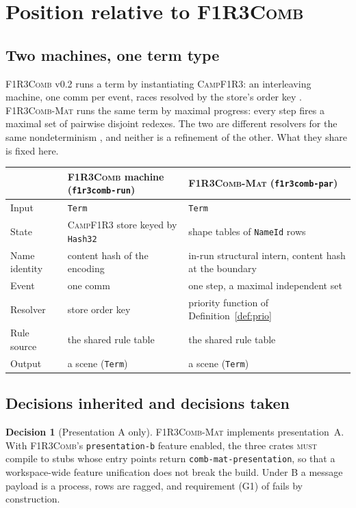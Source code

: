 \documentclass[11pt,a4paper]{article}
\newcommand{\code}[1]{\texttt{#1}}
\newcommand{\Comb}{\textsc{F1R3Comb}}
\newcommand{\Mat}{\textsc{F1R3Comb-Mat}}
\newcommand{\Camp}{\textsc{CampF1R3}}
\newcommand{\MUST}{\textsc{must}}
\theoremstyle{definition}
\newtheorem{decision}[definition]{Decision}
\theoremstyle{plain}
\begin{document}
\section{Position relative to \Comb}\label{sec:position}

\subsection{Two machines, one term type}

\Comb{} v0.2 runs a term by instantiating \Camp: an interleaving machine, one
comm per event, races resolved by the store's order key
\cite[Dec.~8.1]{combspec}. \Mat{} runs the same term by maximal progress:
every step fires a maximal set of pairwise disjoint redexes. The two are
different resolvers for the same nondeterminism \cite[Rem.~8.5]{matnote}, and
neither is a refinement of the other. What they share is fixed here.

\begin{center}
\begin{tabularx}{\linewidth}{@{}l>{\raggedright\arraybackslash}X>{\raggedright\arraybackslash}X@{}}
\toprule
& \Comb{} machine (\code{f1r3comb-run}) & \Mat{} (\code{f1r3comb-par})\\
\midrule
Input & \code{Term} & \code{Term}\\
State & \Camp{} store keyed by \code{Hash32} & shape tables of
\code{NameId} rows\\
Name identity & content hash of the encoding & in-run structural intern,
content hash at the boundary\\
Event & one comm & one step, a maximal independent set\\
Resolver & store order key & priority function of
Definition~\ref{def:prio}\\
Rule source & the shared rule table & the shared rule table\\
Output & a scene (\code{Term}) & a scene (\code{Term})\\
\bottomrule
\end{tabularx}
\end{center}

\subsection{Decisions inherited and decisions taken}

\begin{decision}[Presentation A only]\label{dec:aonly}
\Mat{} implements presentation~A. With \Comb's \code{presentation-b} feature
enabled, the three crates \MUST{} compile to stubs whose entry points return
\code{comb-mat-presentation}, so that a workspace-wide feature unification
does not break the build. Under B a message payload is a process, rows are
ragged, and requirement (G1) of \cite[\S2.1]{matnote} fails by construction.
\end{decision}
\end{document}
